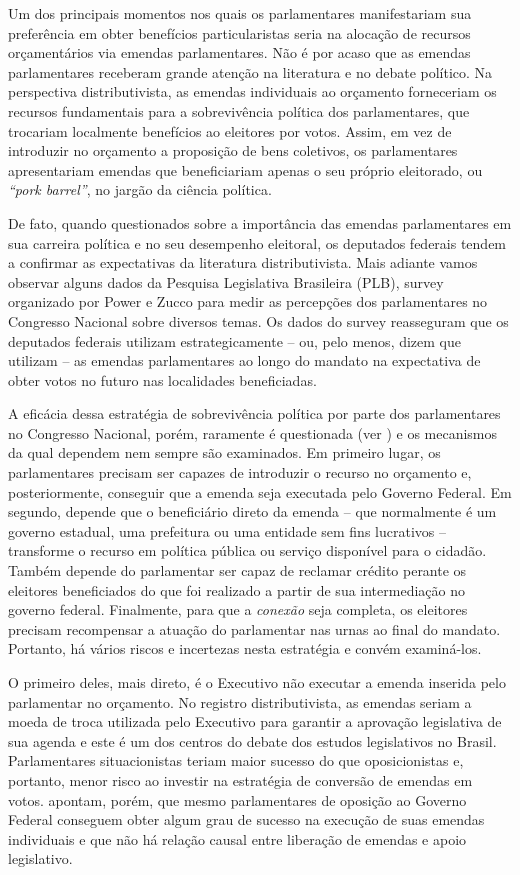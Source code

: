 Um dos principais momentos nos quais os parlamentares manifestariam sua preferência em obter benefícios particularistas seria na alocação de recursos orçamentários via emendas parlamentares. Não é por acaso que as emendas parlamentares receberam grande atenção na literatura e no debate político. Na perspectiva distributivista, as emendas individuais ao orçamento forneceriam os recursos fundamentais para a sobrevivência política dos parlamentares, que trocariam localmente benefícios ao eleitores por votos. Assim, em vez de introduzir no orçamento a proposição de bens coletivos, os parlamentares apresentariam emendas que beneficiariam apenas o seu próprio eleitorado, ou \emph{``pork barrel''}, no jargão da ciência política.

De fato, quando questionados sobre a importância das emendas parlamentares em sua carreira política e no seu desempenho eleitoral, os deputados federais tendem a confirmar as expectativas da literatura distributivista. Mais adiante vamos observar alguns dados da Pesquisa Legislativa Brasileira (PLB), survey organizado por Power e Zucco para medir as percepções dos parlamentares no Congresso Nacional sobre diversos temas. Os dados do survey reasseguram que os deputados federais utilizam estrategicamente -- ou, pelo menos, dizem que utilizam -- as emendas parlamentares ao longo do mandato na expectativa de obter votos no futuro nas localidades beneficiadas.

A eficácia dessa estratégia de sobrevivência política por parte dos parlamentares no Congresso Nacional, porém, raramente é questionada (ver \citealp{Mesquita2008}) e os mecanismos da qual dependem nem sempre são examinados.  Em primeiro lugar, os parlamentares precisam ser capazes de introduzir o recurso no orçamento e, posteriormente, conseguir que a emenda seja executada pelo Governo Federal. Em segundo, depende que o beneficiário direto da emenda -- que normalmente é um governo estadual, uma prefeitura ou uma entidade sem fins lucrativos -- transforme o recurso em política pública ou serviço disponível para o cidadão. Também depende do parlamentar ser capaz de reclamar crédito perante os eleitores beneficiados do que foi realizado a partir de sua intermediação no governo federal. Finalmente, para que a \emph{conexão} seja completa, os eleitores precisam recompensar a atuação do parlamentar nas urnas ao final do mandato. Portanto, há vários riscos e incertezas nesta estratégia e convém examiná-los.

O primeiro deles, mais direto, é o Executivo não executar a emenda inserida pelo parlamentar no orçamento. No registro distributivista, as emendas seriam a moeda de troca utilizada pelo Executivo para garantir a aprovação legislativa de sua agenda e este é um dos centros do debate dos estudos legislativos no Brasil. Parlamentares situacionistas teriam maior sucesso do que oposicionistas e, portanto, menor risco ao investir na estratégia de conversão de emendas em votos. \citet{Figueiredo2008} apontam, porém, que mesmo parlamentares de oposição ao Governo Federal conseguem obter algum grau de sucesso na execução de suas emendas individuais e que não há relação causal entre liberação de emendas e apoio legislativo.

